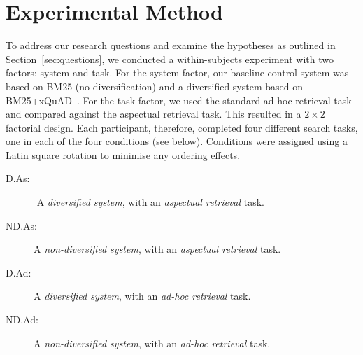 \section{Experimental Method} \label{sec:method}
To address our research questions and examine the hypotheses as outlined in Section~\ref{sec:questions}, we conducted a within-subjects experiment with two factors: system and task. For the system factor, our baseline control system was based on BM25 (no diversification) and a diversified system based on BM25+xQuAD~\cite{santos2010query_reformulations_diversification}. For the task factor, we used the standard ad-hoc retrieval task and compared against the aspectual retrieval task. This resulted in a $2 \times 2$ factorial design. Each participant, therefore, completed four different search tasks, one in each of the four conditions (see below). Conditions were assigned using a Latin square rotation to minimise any ordering effects.


\begin{description}
\item[D.As: $ $ ] $ $ A \emph{diversified system}, with an \emph{aspectual retrieval} task.
\item[ND.As:] A \emph{non-diversified system}, with an \emph{aspectual retrieval} task.
\item[D.Ad: $ $ ] A \emph{diversified system}, with an \emph{ad-hoc retrieval} task. 
\item[ND.Ad:] A \emph{non-diversified system}, with an \emph{ad-hoc retrieval} task.
\end{description}


